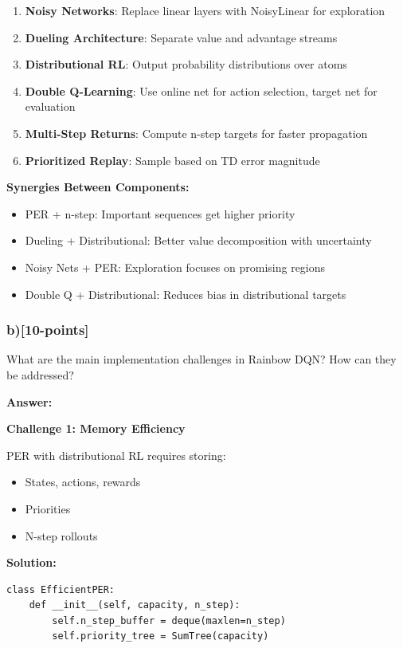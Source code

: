 \documentclass[12pt]{article}
\begin{document}
{{\begin{enumerate}
\item \textbf{Noisy Networks}: Replace linear layers with NoisyLinear for exploration
\item \textbf{Dueling Architecture}: Separate value and advantage streams
\item \textbf{Distributional RL}: Output probability distributions over atoms
\item \textbf{Double Q-Learning}: Use online net for action selection, target net for evaluation
\item \textbf{Multi-Step Returns}: Compute n-step targets for faster propagation
\item \textbf{Prioritized Replay}: Sample based on TD error magnitude
\end{enumerate}

\textbf{Synergies Between Components:}
\begin{itemize}
\item PER + n-step: Important sequences get higher priority
\item Dueling + Distributional: Better value decomposition with uncertainty
\item Noisy Nets + PER: Exploration focuses on promising regions
\item Double Q + Distributional: Reduces bias in distributional targets
\end{itemize}

\subsubsection{b)[10-points]} What are the main implementation challenges in Rainbow DQN? How can they be addressed?

\textbf{Answer:}

\textbf{Challenge 1: Memory Efficiency}

PER with distributional RL requires storing:
\begin{itemize}
\item States, actions, rewards
\item Priorities
\item N-step rollouts
\end{itemize}

\textbf{Solution:}
\begin{verbatim}
class EfficientPER:
    def __init__(self, capacity, n_step):
        self.n_step_buffer = deque(maxlen=n_step)
        self.priority_tree = SumTree(capacity)
    

\end{verbatim}}}
\end{document}
